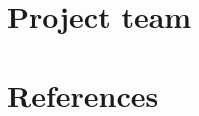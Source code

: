 \documentclass[11pt]{article}
\begin{document}



%
\section{Project team}\label{project-team}



    
 
    \pagebreak
    \section{References} 
    
    

    
    
    \pagebreak
%  


%
%
%
\end{document}
